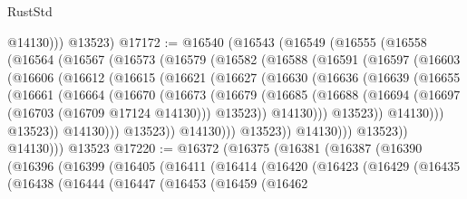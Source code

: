 \begin{lexlean}{RustStd}
\begin{coremodule}
            @14130)))
      @13523)
@17172 := @16540
    (@16543
      (@16549
        (@16555
          (@16558
            (@16564
              (@16567
                (@16573
                  (@16579
                    (@16582
                      (@16588
                        (@16591
                          (@16597
                            (@16603
                              (@16606
                                (@16612
                                  (@16615
                                    (@16621
                                      (@16627
                                        (@16630
                                          (@16636
                                            (@16639
                                              (@16655
                                                (@16661
                                                  (@16664
                                                    (@16670
                                                      (@16673
                                                        (@16679
                                                          (@16685
                                                            (@16688
                                                              (@16694
                                                                (@16697
                                                                  (@16703 (@16709 @17124 @14130)))
                                                                @13523))
                                                            @14130)))
                                                      @13523))
                                                  @14130)))
                                            @13523))
                                        @14130)))
                                  @13523))
                              @14130)))
                        @13523))
                    @14130)))
              @13523))
          @14130)))
    @13523
@17220 := @16372
    (@16375
      (@16381
        (@16387
          (@16390
            (@16396
              (@16399
                (@16405
                  (@16411
                    (@16414
                      (@16420
                        (@16423
                          (@16429
                            (@16435
                              (@16438
                                (@16444
                                  (@16447
                                    (@16453
                                      (@16459
                                        (@16462

\end{coremodule}
\end{lexlean}
